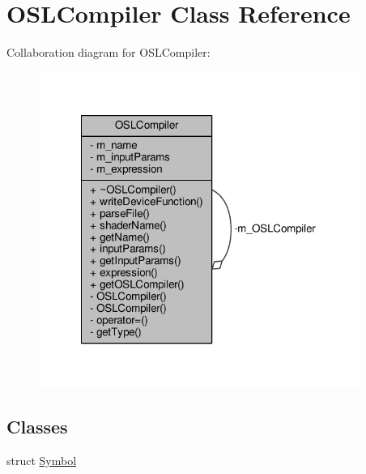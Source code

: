 \hypertarget{class_o_s_l_compiler}{\section{O\-S\-L\-Compiler Class Reference}
\label{class_o_s_l_compiler}
}


Collaboration diagram for O\-S\-L\-Compiler\-:
\nopagebreak
\begin{figure}[H]
\begin{center}
\leavevmode
\includegraphics[width=297pt]{class_o_s_l_compiler__coll__graph}
\end{center}
\end{figure}
\subsection*{Classes}
\begin{DoxyCompactItemize}
\item 
struct \hyperlink{struct_o_s_l_compiler_1_1_symbol}{Symbol}
\end{DoxyCompactItemize}
